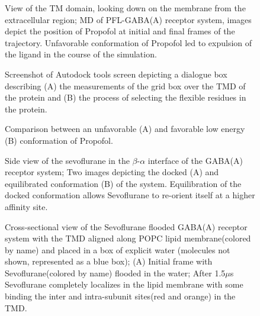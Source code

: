 \documentclass[12pt]{article}
\begin{document}
\begin{figure}
\begin{center}
\centering
\caption{View of the TM domain, looking down on the membrane from the extracellular region;   MD  of  PFL-GABA(A)  receptor  system, images depict the position of Propofol at initial and final frames of the trajectory.  Unfavorable conformation of Propofol led to expulsion of the ligand in the course of the simulation.}
\label{fig:PFLequl}
\end{center}
\end{figure}

\begin{figure}
\begin{center}
\centering
\caption{Screenshot of Autodock tools screen  depicting a dialogue box describing (A) the measurements of the grid box over the TMD of the protein and (B) the process of selecting the flexible residues in the protein. }
\label{fig:adtPic}
\end{center}
\end{figure}

\begin{figure}
\begin{center}
\centering
\caption{Comparison between an unfavorable (A) and favorable low energy (B) conformation of Propofol.}
\label{fig:PFLdihed}
\end{center}
\end{figure}

\begin{figure}
\begin{center}
\centering
\caption{Side view of the sevoflurane in the $\beta$-$\alpha$ interface of the GABA(A) receptor system; Two images depicting the docked (A) and equilibrated conformation (B) of the system. Equilibration of the docked conformation allows Sevoflurane to re-orient itself at a higher affinity site.}
\label{fig:sevMD}
\end{center}
\end{figure}


\begin{figure}
\begin{center}
\centering
\caption{Cross-sectional view of the Sevoflurane flooded GABA(A) receptor system with the TMD aligned along POPC lipid membrane(colored by name) and placed in a box of explicit water (molecules not shown, represented as a blue box); (A) Initial frame with Sevoflurane(colored by name) flooded in the water; After  1.5$\mu$s  Sevoflurane completely localizes in the lipid membrane with some binding the inter and intra-subunit sites(red and orange) in the TMD.}
\label{fig:sevFlood}
\end{center}
\end{figure} 
\end{document}
